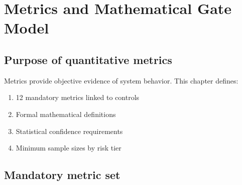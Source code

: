 \chapter{Metrics and Mathematical Gate Model}
\label{ch:metrics}

\section{Purpose of quantitative metrics}

Metrics provide objective evidence of system behavior. This chapter defines:

\begin{enumerate}
  \item 12 mandatory metrics linked to controls
  \item Formal mathematical definitions
  \item Statistical confidence requirements
  \item Minimum sample sizes by risk tier
\end{enumerate}

\section{Mandatory metric set}

